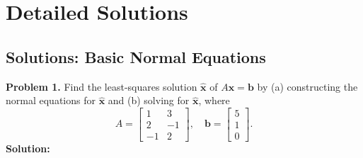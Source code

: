 \documentclass[11pt, letterpaper]{article}
\theoremstyle{definition}
\theoremstyle{remark}
\begin{document}
\newpage

\section{Detailed Solutions}

\subsection{Solutions: Basic Normal Equations}

\textbf{Problem 1.} Find the least-squares solution $\hat{\mathbf{x}}$ of $A\mathbf{x} = \mathbf{b}$ by (a) constructing the normal equations for $\hat{\mathbf{x}}$ and (b) solving for $\hat{\mathbf{x}}$, where
\[
A = \begin{bmatrix} 1 & 3 \\ 2 & -1 \\ -1 & 2 \end{bmatrix}, \quad \mathbf{b} = \begin{bmatrix} 5 \\ 1 \\ 0 \end{bmatrix}.
\]
\textbf{Solution:}
\end{document}
